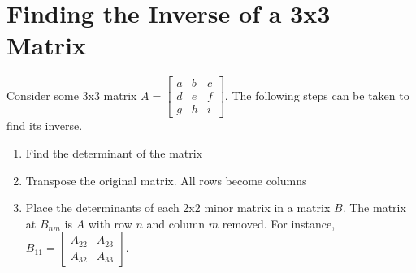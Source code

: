 \documentclass{report}
\begin{document}
\section{Finding the Inverse of a 3x3 Matrix}

Consider some 3x3 matrix 
$
    A=
    \begin{bmatrix}
        a & b & c \\
        d & e & f \\
        g & h & i
    \end{bmatrix}
$. 
The following steps can be taken to find its inverse.

\begin{enumerate}
    \item Find the determinant of the matrix
    \item Transpose the original matrix. All rows become columns
    \item Place the determinants of each 2x2 minor matrix in a matrix $B$. The matrix at $B_{nm}$ is $A$ with row $n$ and column $m$ removed. For instance, 
    $
        B_{11}=
        \begin{bmatrix}
            A_{22} & A_{23} \\
            A_{32} & A_{33}
        \end{bmatrix}
    $.


\end{enumerate}
\end{document}
